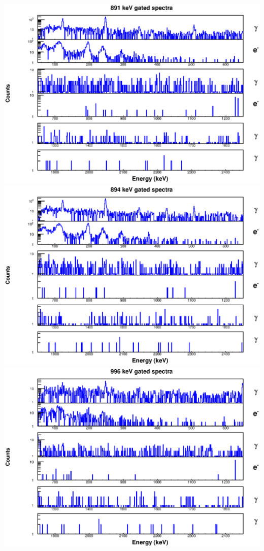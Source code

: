 \begin{landscape}
\includegraphics[scale=1.1]{154Gd_Appendix/891_combined.eps}
\includegraphics[scale=1.1]{154Gd_Appendix/894_combined.eps}
\includegraphics[scale=1.1]{154Gd_Appendix/996_combined.eps}

\end{landscape}
